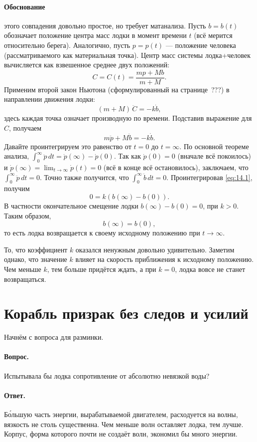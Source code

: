 \paragraph{Обоснование} этого совпадения довольно простое, но требует матанализа.
Пусть $b = b(t)$ обозначает положение
центра масс лодки в момент времени $t$ (всё мерится относительно берега).
Аналогично, пусть $p = p(t)$ — положение человека
(рассматриваемого как материальная точка).
Центр масс системы лодка+человек вычисляется как взвешенное среднее двух положений:
\[C = C(t) = \frac{m p + M b}{m + M}.\]
Применим второй закон Ньютона (сформулированный на странице~???) в направлении движения лодки:
\[(m+M)\,\ddot{C} = -k \dot{b},\]
здесь каждая точка означает производную по времени.
Подставив выражение для $C$, получаем
\begin{equation}
m \ddot{p} + M \ddot{b} = -k \dot{b}.
\label{eq:14.1}
\end{equation}
Давайте проинтегрируем это равенство от $t=0$ до $t=\infty$.
По основной теореме анализа,
$\int_0^\infty \ddot{p}\,dt = \dot{p}(\infty) - \dot{p}(0)$.
Так как $\dot{p}(0)=0$ (вначале всё покоилось) и
$\dot{p}(\infty)=\lim_{t\to\infty}\dot{p}(t)=0$ (всё в конце всё остановилось),
заключаем, что
$\int_0^\infty \ddot{p}\,dt=0$.
Точно также получится, что
$\int_0^\infty \ddot{b}\,dt = 0$.
Проинтегрировав \eqref{eq:14.1}, получим
\[0= k(b(\infty) - b(0)).\]
В частности окончательное смещение лодки $b(\infty) - b(0) = 0$,
при $k > 0$.
Таким образом,
\[
b(\infty) = b(0),
\]
то есть лодка возвращается к своему исходному положению при $t \to \infty$.

То, что коэффициент $k$ оказался ненужным довольно удивительно.
Заметим однако, что значение $k$ влияет на скорость
приближения к исходному положению.
Чем меньше $k$, тем больше придётся ждать, а при $k = 0$, лодка вовсе не станет возвращаться.

\section{Корабль призрак без следов и усилий}

Начнём с вопроса для разминки.

\paragraph{Вопрос.}
Испытывала бы лодка сопротивление от абсолютно невязкой воды?

\paragraph{Ответ.}
Б\'{о}льшую часть энергии, вырабатываемой двигателем, расходуется на волны, вязкость не столь существенна.
Чем меньше волн оставляет лодка, тем лучше.
Корпус, форма которого почти не создаёт волн, экономил бы много энергии.

